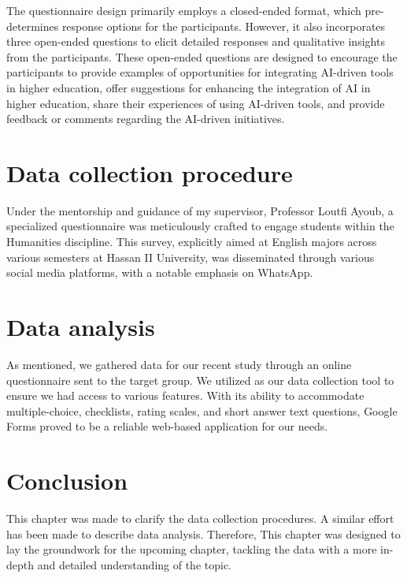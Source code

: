 The questionnaire design primarily employs a closed-ended format,
which pre-determines response options for the participants. However,
it also incorporates three open-ended questions to elicit detailed
responses and qualitative insights from the participants. These
open-ended questions are designed to encourage the participants
to provide examples of opportunities for integrating AI-driven
tools in higher education, offer suggestions for enhancing the integration
of AI in higher education, share their experiences of using AI-driven tools,
and provide feedback or comments regarding the AI-driven initiatives.
\section{Data collection procedure}
Under the mentorship and guidance of my supervisor, Professor Loutfi Ayoub,
a specialized questionnaire was meticulously crafted to engage students within
the Humanities discipline. This survey, explicitly aimed at
English majors across various semesters at Hassan II University,
was disseminated through various social media platforms,
with a notable emphasis on WhatsApp.
\section{Data analysis}
As mentioned, we gathered data for our recent study through an online
questionnaire sent to the target group. We utilized  as
our data collection tool to ensure we had access to various features.
With its ability to accommodate multiple-choice, checklists, rating
scales, and short answer text questions, Google Forms proved to
be a reliable web-based application for our needs.
\section{Conclusion}
This chapter was made to clarify the data collection procedures.
A similar effort has been made to describe data analysis.
Therefore, This chapter was designed to lay the groundwork
for the upcoming chapter, tackling the data with a
more in-depth and detailed understanding of the topic.
